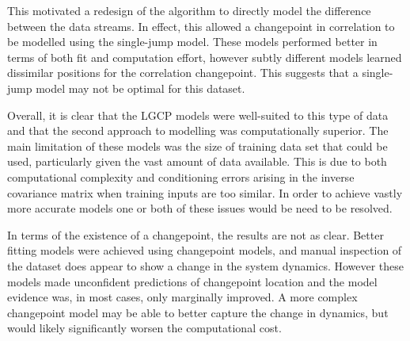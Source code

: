 \documentclass[a4paper,11pt]{report}
\begin{document}
This motivated a redesign of the algorithm to directly model the difference between the data streams. In effect, this allowed a changepoint in correlation to be modelled using the single-jump model. These models performed better in terms of both fit and computation effort, however subtly different models learned dissimilar positions for the correlation changepoint. This suggests that a single-jump model may not be optimal for this dataset. \par

Overall, it is clear that the LGCP models were well-suited to this type of data and that the second approach to modelling was computationally superior. The main limitation of these models was the size of training data set that could be used, particularly given the vast amount of data available. This is due to both computational complexity and conditioning errors arising in the inverse covariance matrix when training inputs are too similar. In order to achieve vastly more accurate models one or both of these issues would be need to be resolved. \par

In terms of the existence of a changepoint, the results are not as clear. Better fitting models were achieved using changepoint models, and manual inspection of the dataset does appear to show a change in the system dynamics. However these models made unconfident predictions of changepoint location and the model evidence was, in most cases, only marginally improved. A more complex changepoint model may be able to better capture the change in dynamics, but would likely significantly worsen the computational cost. 

\singlespacing 

\newpage



\end{document}
